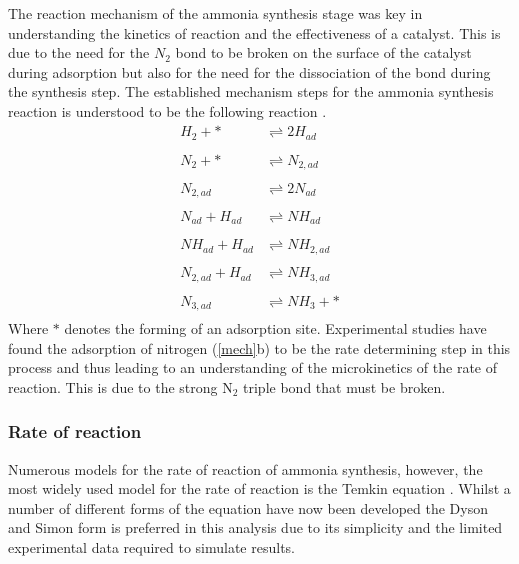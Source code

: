 {The reaction mechanism of the ammonia synthesis stage was key in understanding the kinetics of reaction and the effectiveness of a catalyst. This is due to the need for the $N_2$ bond to be broken on the surface of the catalyst during adsorption but also for the need for the dissociation of the bond during the synthesis step. The established mechanism steps for the ammonia synthesis reaction is understood to be the following reaction \cite{Jennings1991}.
\begin{subequations}
	\label{mech}
\begin{align}
H_2+*   &\underset{ }{\stackrel{ }{\rightleftharpoons}}   2H_{ad}\\
N_2+*   &\underset{ }{\stackrel{ }{\rightleftharpoons}}   N_{2,ad}\\
N_{2,ad}   &\underset{ }{\stackrel{ }{\rightleftharpoons}}   2N_{ad}\\
N_{ad}+H_{ad}   &\underset{ }{\stackrel{ }{\rightleftharpoons}}   NH_{ad}\\
NH_{ad}+H_{ad}   &\underset{ }{\stackrel{ }{\rightleftharpoons}}   NH_{2,ad}\\
N_{2,ad}+H_{ad}   &\underset{ }{\stackrel{ }{\rightleftharpoons}}   NH_{3,ad}\\
N_{3,ad}   &\underset{ }{\stackrel{ }{\rightleftharpoons}}   NH_{3}+*
\end{align}
\end{subequations}
Where $*$ denotes the forming of an adsorption site. Experimental studies have found the adsorption of nitrogen (\ref{mech}b) to be the rate determining step in this process and thus leading to an understanding of the microkinetics of the rate of reaction. This is due to the strong N$_2$ triple bond that must be broken.

%


\subsubsection{Rate of reaction}

Numerous models \cite{Aparicio2008} for the rate of reaction of ammonia synthesis, however, the most widely used model for the rate of reaction is the Temkin equation \cite{Guacci1977}. Whilst a number of different forms of the equation have now been developed the Dyson and Simon \cite{Dyson1968} form is preferred in this analysis due to its simplicity and the limited experimental data required to simulate results.

}
